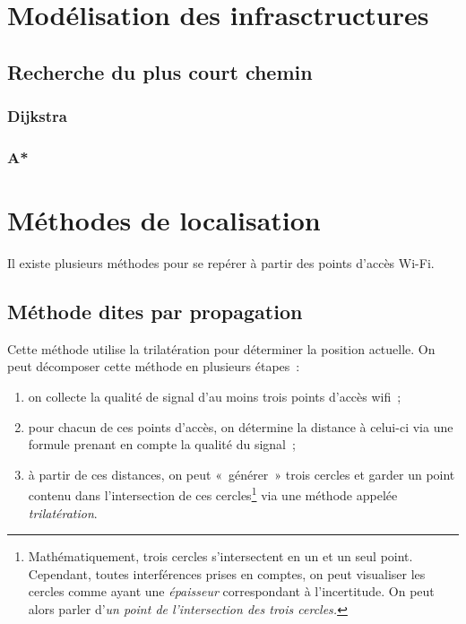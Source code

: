 \documentclass[11pt,a4paper]{article}
\begin{document}
\section{Modélisation des infrasctructures}
  \subsection{Recherche du plus court chemin}
    \subsubsection{Dijkstra}
    \subsubsection{A*}

\section{Méthodes de localisation}
  Il existe plusieurs méthodes pour se repérer à partir des points d'accès Wi-Fi.

  \subsection{Méthode dites par propagation}
    Cette méthode utilise la trilatération pour déterminer la position actuelle. On peut décomposer cette méthode en plusieurs étapes~:
    \begin{enumerate}
      \item on collecte la qualité de signal d'au moins trois points d'accès wifi~;
      \item pour chacun de ces points d'accès, on détermine la distance à celui-ci via une formule prenant en compte la qualité du signal~;
      \item à partir de ces distances, on peut «~générer~» trois cercles et garder un point contenu dans l'intersection de ces cercles\footnote{Mathématiquement, trois cercles s'intersectent en un et un seul point. Cependant, toutes interférences prises en comptes, on peut visualiser les cercles comme ayant une \textit{épaisseur} correspondant à l'incertitude. On peut alors parler d'\textit{un point de l'intersection des trois cercles.}} via une méthode appelée \textit{trilatération}.
    \end{enumerate}
\end{document}
